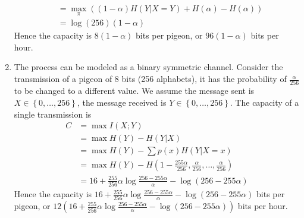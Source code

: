 \begin{exercise}
\begin{solution}
\begin{enumerate}
{\begin{equation}
\begin{aligned}
        &=\max _{\pi}((1-\alpha) H(Y|X = Y)+H(\alpha)-H(\alpha))\\
        &=\log(256) (1- \alpha)
      \end{aligned}
    \end{equation}  
    Hence the capacity is $8(1-\alpha)$ bits per pigeon, or $96(1-\alpha)$ bits per hour.
    }
    \item { The process can be modeled as a binary symmetric channel. Consider the transmission of a pigeon of 8 bits (256 alphabets), it has the probability of $\frac{\alpha}{256}$ to be changed to a different value. We assume the message sent is $X \in \left\{0, \ldots, 256 \right\}$, the message received is $Y \in \left\{0, \ldots, 256\right\}$. The capacity of a single transmission is
    \begin{equation}
      \begin{aligned}
        C&=\max I(X ; Y) \\
 &=\max H(Y)-H(Y | X) \\
 &=\max H(Y)-\sum p(x) H(Y | X=x) \\
 &=\max H(Y)-H\left(1 - \frac{255\alpha}{256}, \frac{\alpha}{256}, \ldots, \frac{\alpha}{256}\right) \\
 &= 16 + \frac{255}{256}\alpha \log \frac{256-255\alpha}{\alpha} - \log (256 - 255\alpha) 
        \end{aligned}
    \end{equation}  
    Hence the capacity is $16 + \frac{255}{256}\alpha \log \frac{256-255\alpha}{\alpha} - \log (256 - 255\alpha)$ bits per pigeon, or $12(16 + \frac{255}{256}\alpha \log \frac{256-255\alpha}{\alpha} - \log (256 - 255\alpha))$ bits per hour.
    
    }
  \end{enumerate}
  \end{solution}
  \label{ex7-1}
\end{exercise}

